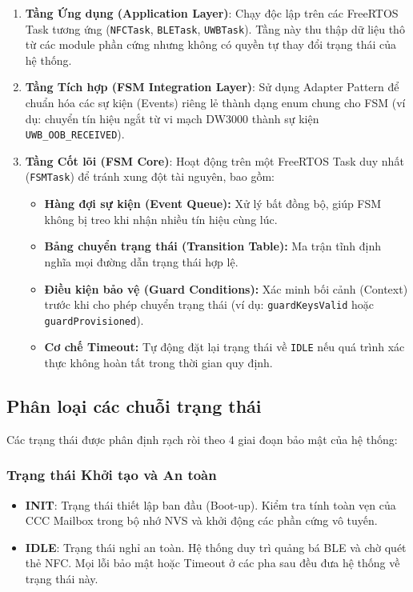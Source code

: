 \begin{enumerate}
  \item \textbf{Tầng Ứng dụng (Application Layer)}: 
  Chạy độc lập trên các FreeRTOS Task tương ứng (\texttt{NFCTask}, \texttt{BLETask}, \texttt{UWBTask}). Tầng này thu thập dữ liệu thô từ các module phần cứng nhưng không có quyền tự thay đổi trạng thái của hệ thống.
  
  \item \textbf{Tầng Tích hợp (FSM Integration Layer)}: 
  Sử dụng Adapter Pattern để chuẩn hóa các sự kiện (Events) riêng lẻ thành dạng enum chung cho FSM (ví dụ: chuyển tín hiệu ngắt từ vi mạch DW3000 thành sự kiện \texttt{UWB\_OOB\_RECEIVED}).
  
  \item \textbf{Tầng Cốt lõi (FSM Core)}: 
  Hoạt động trên một FreeRTOS Task duy nhất (\texttt{FSMTask}) để tránh xung đột tài nguyên, bao gồm:
  \begin{itemize}
    \item \textbf{Hàng đợi sự kiện (Event Queue):} Xử lý bất đồng bộ, giúp FSM không bị treo khi nhận nhiều tín hiệu cùng lúc.
    \item \textbf{Bảng chuyển trạng thái (Transition Table):} Ma trận tĩnh định nghĩa mọi đường dẫn trạng thái hợp lệ.
    \item \textbf{Điều kiện bảo vệ (Guard Conditions):} Xác minh bối cảnh (Context) trước khi cho phép chuyển trạng thái (ví dụ: \texttt{guardKeysValid} hoặc \texttt{guardProvisioned}).
    \item \textbf{Cơ chế Timeout:} Tự động đặt lại trạng thái về \texttt{IDLE} nếu quá trình xác thực không hoàn tất trong thời gian quy định.
  \end{itemize}
\end{enumerate}

\subsection{Phân loại các chuỗi trạng thái}

Các trạng thái được phân định rạch ròi theo 4 giai đoạn bảo mật của hệ thống:

\subsubsection{Trạng thái Khởi tạo và An toàn}
\begin{itemize}
  \item \textbf{INIT}: Trạng thái thiết lập ban đầu (Boot-up). Kiểm tra tính toàn vẹn của CCC Mailbox trong bộ nhớ NVS và khởi động các phần cứng vô tuyến.
  \item \textbf{IDLE}: Trạng thái nghỉ an toàn. Hệ thống duy trì quảng bá BLE và chờ quét thẻ NFC. Mọi lỗi bảo mật hoặc Timeout ở các pha sau đều đưa hệ thống về trạng thái này.
\end{itemize}

